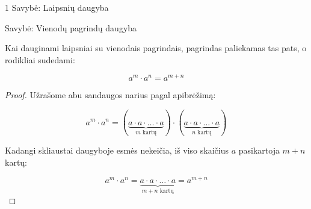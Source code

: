 \documentclass[aspectratio=169,10pt]{beamer}
\newenvironment{property}[1][]%
{\begin{block}{Savybė: #1}}%
{\end{block}}
\begin{document}
\begin{frame}{1 Savybė: Laipsnių daugyba}

    \begin{property}[Vienodų pagrindų daugyba]

        Kai dauginami laipsniai su vienodais pagrindais,
        pagrindas paliekamas tas pats, o rodikliai sudedami:

        \[
        a^m\cdot a^n=a^{m+n}
        \]

    \end{property}

    \begin{proof}

        Užrašome abu sandaugos narius pagal apibrėžimą:

        \[
        a^m\cdot a^n
        =
        \left(
        \underbrace{
        a\cdot a\cdot\dots\cdot a
        }_{m\text{ kartų}}
        \right)
        \cdot
        \left(
        \underbrace{
        a\cdot a\cdot\dots\cdot a
        }_{n\text{ kartų}}
        \right)
        \]

        Kadangi skliaustai daugyboje esmės nekeičia,
        iš viso skaičius $a$ pasikartoja $m+n$ kartų:

        \[
        a^m\cdot a^n
        =
        \underbrace{
        a\cdot a\cdot\dots\cdot a
        }_{m+n\text{ kartų}}
        =
        a^{m+n}
        \]

    \end{proof}

\end{frame}
\end{document}
